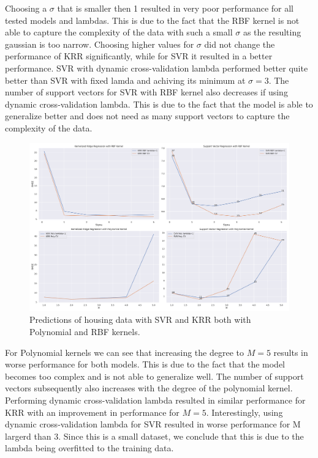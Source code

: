 \documentclass[9pt]{IEEEtran}
\begin{document}
Choosing a $\sigma$ that is smaller then 1 resulted in very poor performance for all tested models and lambdas.
This is due to the fact that the RBF kernel is not able to capture the complexity of the data with such a small $\sigma$ as the resulting gaussian is too narrow.
Choosing higher values for $\sigma$ did not change the performance of KRR significantly, while for SVR it resulted in a better performance.
SVR with dynamic cross-validation lambda performed better quite better than SVR with fixed lamda and achiving its minimum at $\sigma=3$.
The number of support vectors for SVR with RBF kernel also decreases if using dynamic cross-validation lambda. 
This is due to the fact that the model is able to generalize better and does not need as many support vectors to capture the complexity of the data.

\begin{figure}[t]
    \centering
    \includegraphics[width=1\textwidth]{housing_results.pdf} %
    \caption{Predictions of housing data with SVR and KRR both with Polynomial and RBF kernels.}
    \label{fig_housing}
\end{figure}

For Polynomial kernels we can see that increasing the degree to $M=5$ results in worse performance for both models.
This is due to the fact that the model becomes too complex and is not able to generalize well.
The number of support vectors subsequently also increases with the degree of the polynomial kernel.
Performing dynamic cross-validation lambda resulted in similar performance for KRR with an improvement in performance for $M=5$.
Interestingly, using dynamic cross-validation lambda for SVR resulted in worse performance for M largerd than 3.
Since this is a small dataset, we conclude that this is due to the lambda being overfitted to the training data.
\end{document}
